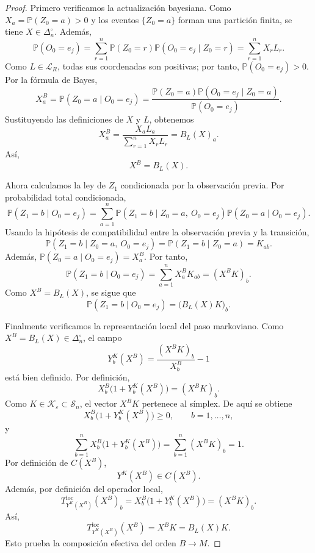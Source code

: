 \documentclass[12pt]{article}
\begin{document}
\begin{proof}
Primero verificamos la actualización bayesiana. Como \(X_a=\mathbb P(Z_0=a)>0\) y los eventos \(\{Z_0=a\}\) forman una partición finita, se tiene \(X\in\Delta_n^\circ\). Además,
\[
\mathbb P(O_0=e_j)
=
\sum_{r=1}^n
\mathbb P(Z_0=r)\mathbb P(O_0=e_j\mid Z_0=r)
=
\sum_{r=1}^nX_rL_r.
\]
Como \(L\in\mathcal L_R\), todas sus coordenadas son positivas; por tanto, \(\mathbb P(O_0=e_j)>0\). Por la fórmula de Bayes,
\[
X^B_a
=
\mathbb P(Z_0=a\mid O_0=e_j)
=
\frac{
\mathbb P(Z_0=a)\mathbb P(O_0=e_j\mid Z_0=a)
}{
\mathbb P(O_0=e_j)
}.
\]
Sustituyendo las definiciones de \(X\) y \(L\), obtenemos
\[
X^B_a
=
\frac{X_aL_a}{\sum_{r=1}^nX_rL_r}
=
B_L(X)_a.
\]
Así,
\[
X^B=B_L(X).
\]

Ahora calculamos la ley de \(Z_1\) condicionada por la observación previa. Por probabilidad total condicionada,
\[
\mathbb P(Z_1=b\mid O_0=e_j)
=
\sum_{a=1}^n
\mathbb P(Z_1=b\mid Z_0=a,\ O_0=e_j)
\mathbb P(Z_0=a\mid O_0=e_j).
\]
Usando la hipótesis de compatibilidad entre la observación previa y la transición,
\[
\mathbb P(Z_1=b\mid Z_0=a,\ O_0=e_j)
=
\mathbb P(Z_1=b\mid Z_0=a)
=
K_{ab}.
\]
Además, \(\mathbb P(Z_0=a\mid O_0=e_j)=X^B_a\). Por tanto,
\[
\mathbb P(Z_1=b\mid O_0=e_j)
=
\sum_{a=1}^nX^B_aK_{ab}
=
(X^BK)_b.
\]
Como \(X^B=B_L(X)\), se sigue que
\[
\mathbb P(Z_1=b\mid O_0=e_j)
=
\bigl(B_L(X)K\bigr)_b.
\]

Finalmente verificamos la representación local del paso markoviano. Como \(X^B=B_L(X)\in\Delta_n^\circ\), el campo
\[
Y_b^K(X^B)
=
\frac{(X^BK)_b}{X_b^B}-1
\]
está bien definido. Por definición,
\[
X_b^B\bigl(1+Y_b^K(X^B)\bigr)
=
(X^BK)_b.
\]
Como \(K\in\mathcal K_\varepsilon\subset\mathcal S_n\), el vector \(X^BK\) pertenece al símplex. De aquí se obtiene
\[
X_b^B\bigl(1+Y_b^K(X^B)\bigr)\ge 0,
\qquad b=1,\dots,n,
\]
y
\[
\sum_{b=1}^n
X_b^B\bigl(1+Y_b^K(X^B)\bigr)
=
\sum_{b=1}^n(X^BK)_b
=
1.
\]
Por definición de \(C(X^B)\),
\[
Y^K(X^B)\in C(X^B).
\]
Además, por definición del operador local,
\[
T^{\mathrm{loc}}_{Y^K(X^B)}(X^B)_b
=
X_b^B\bigl(1+Y_b^K(X^B)\bigr)
=
(X^BK)_b.
\]
Así,
\[
T^{\mathrm{loc}}_{Y^K(X^B)}(X^B)
=
X^BK
=
B_L(X)K.
\]
Esto prueba la composición efectiva del orden \(B\to M\).
\end{proof}
\end{document}
